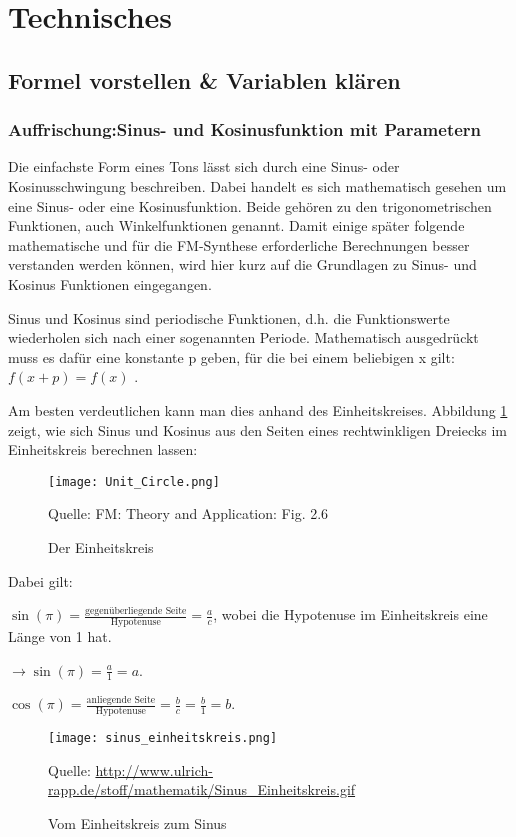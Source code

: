 \section{Technisches}

\subsection{Formel vorstellen \& Variablen klären}
\subsubsection{Auffrischung:Sinus- und Kosinusfunktion mit Parametern}
Die einfachste Form eines Tons lässt sich durch eine Sinus- oder Kosinusschwingung beschreiben. Dabei handelt es sich mathematisch gesehen um eine Sinus- oder eine Kosinusfunktion. Beide gehören zu den trigonometrischen Funktionen, auch Winkelfunktionen genannt. Damit einige später folgende mathematische und für die FM-Synthese erforderliche Berechnungen besser verstanden werden können, wird hier kurz auf die Grundlagen zu Sinus- und Kosinus Funktionen eingegangen. 

Sinus und Kosinus sind periodische Funktionen, d.h. die Funktionswerte wiederholen sich nach einer sogenannten Periode. Mathematisch ausgedrückt muss es dafür eine konstante p  geben, für die bei einem beliebigen x gilt: $f(x + p) =  f(x)$ .

Am besten verdeutlichen kann man dies anhand des Einheitskreises. Abbildung \ref{fig:unitcircle} zeigt, wie sich Sinus und Kosinus aus den Seiten eines rechtwinkligen Dreiecks im Einheitskreis berechnen lassen:

\begin{figure} [ht]
\centering
\texttt{[image: Unit\_Circle.png]}
\caption{Der Einheitskreis}
\label{fig:unitcircle}
Quelle: FM: Theory and Application: Fig. 2.6
\end{figure}

Dabei gilt: 

$\sin(\pi) = \frac{\text{gegenüberliegende Seite}}{\text{Hypotenuse}} = \frac{a}{c}$, wobei die Hypotenuse im Einheitskreis eine Länge von 1 hat. 

$\to\sin(\pi) = \frac{a}{1} = a$.

$\cos(\pi) = \frac{\text{anliegende Seite}}{\text{Hypotenuse}} = \frac{b}{c} = \frac{b}{1} = b$.\\

\begin{figure} [ht]
\centering
\texttt{[image: sinus\_einheitskreis.png]}
\caption{Vom Einheitskreis zum Sinus}
\label{fig:unitcircleToSinus}
Quelle: \url{http://www.ulrich-rapp.de/stoff/mathematik/Sinus_Einheitskreis.gif}
\end{figure}

